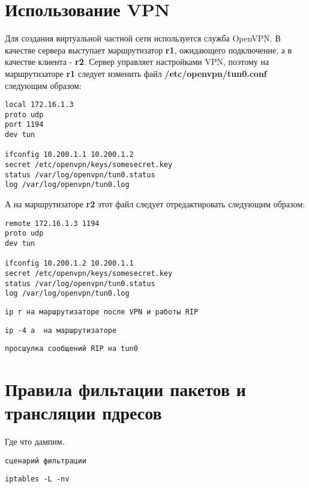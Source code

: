 \documentclass[a4paper,12pt]{article}
\begin{document}
\section{Использование VPN}

Для создания виртуальной частной сети используется служба OpenVPN.
В качестве сервера выступает маршрутизатор \textbf{r1}, ожидающего подключение, а в качестве клиента - \textbf{r2}. Сервер управляет
настройками VPN, поэтому на маршрутизаторе \textbf{r1} следует
изменить файл \textbf{/etc/openvpn/tun0.conf} следующим образом:
\begin{Verbatim}
local 172.16.1.3
proto udp
port 1194
dev tun

ifconfig 10.200.1.1 10.200.1.2
secret /etc/openvpn/keys/somesecret.key
status /var/log/openvpn/tun0.status
log /var/log/openvpn/tun0.log
\end{Verbatim}

А на маршрутизаторе \textbf{r2} этот файл следует отредактировать
следующим образом:
\begin{Verbatim}
remote 172.16.1.3 1194 
proto udp
dev tun

ifconfig 10.200.1.2 10.200.1.1
secret /etc/openvpn/keys/somesecret.key
status /var/log/openvpn/tun0.status
log /var/log/openvpn/tun0.log
\end{Verbatim}

\begin{Verbatim}
ip r на маршрутизаторе после VPN и работы RIP
\end{Verbatim}

\begin{Verbatim}
ip -4 a  на маршрутизаторе
\end{Verbatim}

\begin{Verbatim}
просшулка сообщений RIP на tun0
\end{Verbatim}


\section{Правила фильтации пакетов и трансляции пдресов}

Где что дампим.

\begin{Verbatim}
сценарий фильтрации
\end{Verbatim}

\begin{Verbatim}
iptables -L -nv
\end{Verbatim}
\end{document}
